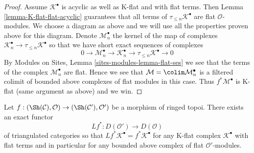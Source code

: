 \begin{proof}
\medskip\noindent
Assume $\mathcal{K}^\bullet$ is acyclic as well as K-flat and
with flat terms. Then Lemma \ref{lemma-K-flat-flat-acyclic}
guarantees that all terms of $\tau_{\leq n}\mathcal{K}^\bullet$
are flat $\mathcal{O}$-modules. We choose a diagram as above and
we will use all the properties proven above for this diagram.
Denote $\mathcal{M}_n^\bullet$ the kernel of the map of complexes
$\mathcal{K}_n^\bullet \to \tau_{\leq n}\mathcal{K}^\bullet$
so that we have short exact sequences of complexes
$$
0 \to \mathcal{M}_n^\bullet \to \mathcal{K}_n^\bullet \to
\tau_{\leq n}\mathcal{K}^\bullet \to 0
$$
By Modules on Sites, Lemma \ref{sites-modules-lemma-flat-ses}
we see that the terms of the complex $\mathcal{M}_n^\bullet$ are flat.
Hence we see that $\mathcal{M} = \colim \mathcal{M}_n^\bullet$
is a filtered colimit of bounded above complexes of flat modules
in this case. Thus $f^*\mathcal{M}^\bullet$ is K-flat
(same argument as above) and we win.
\end{proof}

\begin{lemma}
\label{lemma-derived-base-change}
Let $f : (\Sh(\mathcal{C}), \mathcal{O}) \to (\Sh(\mathcal{C}'), \mathcal{O}')$
be a morphism of ringed topoi. There exists an exact functor
$$
Lf^* : D(\mathcal{O}') \longrightarrow D(\mathcal{O})
$$
of triangulated categories so that
$Lf^*\mathcal{K}^\bullet = f^*\mathcal{K}^\bullet$ for any
K-flat complex $\mathcal{K}^\bullet$ with flat terms and
in particular for any bounded above complex of flat $\mathcal{O}'$-modules.
\end{lemma}


